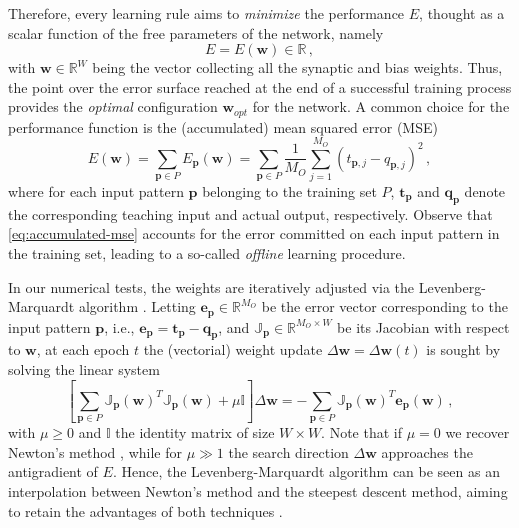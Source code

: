 \documentclass{elsarticle}
\numberwithin{equation}{section}
\theoremstyle{theorem}
\theoremstyle{definition}
\theoremstyle{remark}
\theoremstyle{proposition}
\numberwithin{figure}{section}
\begin{document}
		Therefore, every learning rule aims to \emph{minimize} the performance $E$, thought as a scalar function of the free parameters of the network, namely 
		\begin{equation*}
			\label{eq:performance-function}
			E = E(\mathbf{w}) \in \mathbb{R} \, , 
		\end{equation*}
		with $\mathbf{w} \in \mathbb{R}^{W}$ being the vector collecting all the synaptic and bias weights. Thus, the point over the error surface reached at the end of a successful training process provides the \emph{optimal} configuration $\mathbf{w}_{opt}$ for the network. A common choice for the performance function is the (accumulated) mean squared error (MSE)
		\begin{equation}
			\label{eq:accumulated-mse}
			E(\mathbf{w}) = \sum_{\mathbf{p} \in P} E_{\mathbf{p}}(\mathbf{w}) = \sum_{\mathbf{p} \in P} \dfrac{1}{M_O} \sum_{j = 1}^{M_O} \left( t_{\mathbf{p},j} - q_{\mathbf{p},j} \right)^2 \, ,
		\end{equation}
		where for each input pattern $\mathbf{p}$ belonging to the training set $P$, $\mathbf{t}_{\mathbf{p}}$ and $\mathbf{q}_{\mathbf{p}}$ denote the corresponding teaching input and actual output, respectively. Observe that \eqref{eq:accumulated-mse} accounts for the error committed on each input pattern in the training set, leading to a so-called \emph{offline} learning procedure.
		
		In our numerical tests, the weights are iteratively adjusted via the Levenberg-Marquardt algorithm \cite{Hag94, Mar63}. Letting $\mathbf{e}_{\mathbf{p}} \in \mathbb{R}^{M_O}$ be the error vector corresponding to the input pattern $\mathbf{p}$, i.e., $\mathbf{e}_{\mathbf{p}} = \mathbf{t}_{\mathbf{p}} - \mathbf{q}_{\mathbf{p}}$, and $\mathbb{J}_{\mathbf{p}} \in \mathbb{R}^{M_O \times W}$ be its Jacobian with respect to $\mathbf{w}$, at each epoch $t$ the (vectorial) weight update $\Delta \mathbf{w} = \Delta \mathbf{w}(t)$ is sought by solving the linear system
		\begin{equation}
			\label{eq:levenberg-marquardt}
			\left[ \sum_{\mathbf{p} \in P} \mathbb{J}_{\mathbf{p}}(\mathbf{w})^T \mathbb{J}_{\mathbf{p}}(\mathbf{w}) + \mu \mathbb{I} \right] \Delta \mathbf{w} = - \sum_{\mathbf{p} \in P} \mathbb{J}_{\mathbf{p}}(\mathbf{w})^T \mathbf{e}_{\mathbf{p}}(\mathbf{w}) \, ,
		\end{equation}
		with $\mu \geq 0$ and $\mathbb{I}$ the identity matrix of size $W \times W$. Note that if $\mu = 0$ we recover Newton's method \cite{Hag94}, while for $\mu \gg 1$ the search direction $\Delta \mathbf{w}$ approaches the antigradient of $E$. Hence, the Levenberg-Marquardt algorithm can be seen as an interpolation between Newton's method and the steepest descent method, aiming to retain the advantages of both techniques \cite{Mar63}.
		
\end{document}
